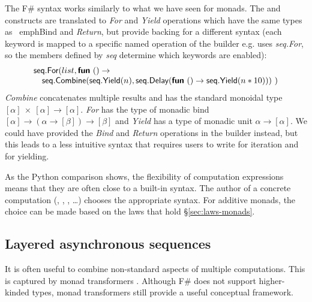 \documentclass[runningheads,a4paper]{llncs}
\begin{document}
The F\# syntax works similarly to what we have seen for monads. The  and  
constructs are translated to \emph{For} and \emph{Yield} operations which have the same types as \
emph{Bind} and \emph{Return}, but provide backing for a different syntax (each keyword 
is mapped to a specific named operation of the builder e.g. \ident{for} uses \emph{seq.For},
so the members defined by \emph{seq} determine which keywords are enabled):
%
\vspace{-0.15em}
\begin{equation*}
\begin{array}{l}
\ident{seq}.\ident{For}(list, \kvd{fun}~() \rightarrow \\
\quad \ident{seq}.\ident{Combine}(\ident{seq}.\ident{Yield}(n), \ident{seq}.\ident{Delay}(\kvd{fun}~() \rightarrow 
   \ident{seq}.\ident{Yield}(n * 10)))~)
\end{array}
\vspace{-0.05em}
\end{equation*}
%
\emph{Combine} concatenates multiple results and has the standard monoidal type
$[\alpha]~\times~[\alpha] \rightarrow [\alpha]$. \emph{For} has the type of monadic 
bind $[\alpha] \rightarrow (\alpha \rightarrow [\beta]) \rightarrow [\beta]$ and \emph{Yield} has a
type of monadic unit $\alpha \rightarrow [\alpha]$. We could have provided the \emph{Bind} 
and \emph{Return} operations in the \ident{seq} builder instead, but this leads to a less intuitive
syntax that requires users to write \ident{let!} for iteration and \ident{return} for yielding.

As the Python comparison shows, the flexibility of computation expressions means that they
are often close to a built-in syntax. The author of a concrete computation (\ident{parse}, 
\ident{seq}, \ident{async}, \ldots) chooses the appropriate syntax. For additive monads,
the choice can be made based on the laws that hold \S\ref{sec:laws-monads}.


\subsection{Layered asynchronous sequences}
\label{sec:intro-asyncseq}
 
It is often useful to combine non-standard aspects of multiple computations. 
This is captured by monad transformers \cite{monad-transformers}. Although F\# does not support
higher-kinded types, monad transformers still provide a useful conceptual framework. 
\end{document}

